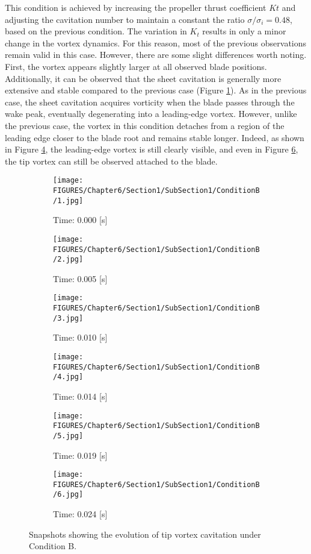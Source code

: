 This condition is achieved by increasing the propeller thrust coefficient $Kt$ and adjusting the cavitation number to maintain a constant the ratio $\sigma/\sigma_i = 0.48$, based on the previous condition. The variation in $K_t$ results in only a minor change in the vortex dynamics. For this reason,  most of the previous observations remain valid in this case.
However, there are some slight differences worth noting. First, the vortex appears slightly larger at all observed blade positions. Additionally, it can be observed that the sheet cavitation is generally more extensive and stable compared to the previous case (Figure \ref{fig:0B}).
As in the previous case, the sheet cavitation acquires vorticity when the blade passes through the wake peak, eventually degenerating into a leading-edge vortex. However, unlike the previous case, the vortex in this condition detaches from a region of the leading edge closer to the blade root and remains stable longer.
Indeed, as shown in Figure \ref{fig:14B}, the leading-edge vortex is still clearly visible, and even in Figure \ref{fig:24B}, the tip vortex can still be observed attached to the blade.

\begin{figure}[!htb]
    \centering
    \begin{subfigure}[b]{0.31\textwidth}
        \texttt{[image: FIGURES/Chapter6/Section1/SubSection1/ConditionB/1.jpg]}
        \caption{Time: 0.000 [s]}
        \label{fig:0B}
    \end{subfigure}
    \hfill
    \begin{subfigure}[b]{0.31\textwidth}
        \texttt{[image: FIGURES/Chapter6/Section1/SubSection1/ConditionB/2.jpg]}
        \caption{Time: 0.005 [s]}
        \label{fig:5B}
    \end{subfigure}
    \hfill
    \begin{subfigure}[b]{0.31\textwidth}
        \texttt{[image: FIGURES/Chapter6/Section1/SubSection1/ConditionB/3.jpg]}
        \caption{Time: 0.010 [s]}
        \label{fig:10B}
    \end{subfigure}
    \medskip
    \begin{subfigure}[b]{0.31\textwidth}
        \texttt{[image: FIGURES/Chapter6/Section1/SubSection1/ConditionB/4.jpg]}
        \caption{Time: 0.014 [s]}
        \label{fig:14B}
    \end{subfigure}
    \hfill
    \begin{subfigure}[b]{0.31\textwidth}
        \texttt{[image: FIGURES/Chapter6/Section1/SubSection1/ConditionB/5.jpg]}
        \caption{Time: 0.019 [s]}
        \label{fig:19B}
    \end{subfigure}
    \hfill
    \begin{subfigure}[b]{0.31\textwidth}
        \texttt{[image: FIGURES/Chapter6/Section1/SubSection1/ConditionB/6.jpg]}
        \caption{Time: 0.024 [s]}
        \label{fig:24B}
    \end{subfigure}
    \caption{Snapshots showing the evolution of tip vortex cavitation under Condition B.}
    \label{fig:SnapshotB}
\end{figure}

